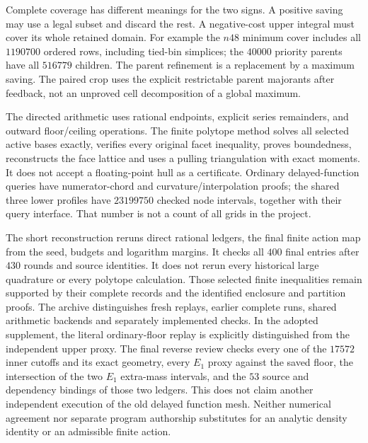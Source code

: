 Complete coverage has different meanings for the two signs.  A
positive saving may use a legal subset and discard the rest.  A
negative-cost upper integral must cover its whole retained domain.
For example the $n48$ minimum cover includes all $1190700$ ordered
rows, including tied-bin simplices; the $40000$ priority parents
have all $516779$ children.  The parent refinement is a replacement
by a maximum saving.  The paired crop uses the explicit restrictable
parent majorants after feedback, not an unproved cell decomposition
of a global maximum.

The directed arithmetic uses rational endpoints, explicit series
remainders, and outward floor/ceiling operations.  The finite
polytope method solves all selected active bases exactly, verifies
every original facet inequality, proves boundedness, reconstructs
the face lattice and uses a pulling triangulation with exact
moments.  It does not accept a floating-point hull as a certificate.
Ordinary delayed-function queries have numerator-chord and
curvature/interpolation proofs; the shared three lower profiles
have $23199750$ checked node intervals, together with their query
interface.  That number is not a count of all grids in the project.

The short reconstruction reruns direct rational ledgers, the final
finite action map from the seed, budgets and logarithm margins.
It checks all $400$ final entries after $430$ rounds and source
identities.  It does not rerun every historical large quadrature or
every polytope calculation.  Those selected finite inequalities
remain supported by their complete records and the identified
enclosure and partition proofs.  The archive distinguishes fresh
replays, earlier complete runs, shared arithmetic backends and
separately implemented checks.  In the adopted supplement, the literal
ordinary-floor replay is explicitly distinguished from the independent
upper proxy.  The final reverse review checks every one of the $17572$
inner cutoffs and its exact geometry, every $E_1$ proxy against the
saved floor, the intersection of the two $E_1$ extra-mass intervals,
and the $53$ source and dependency bindings of those two ledgers.
This does not claim another independent execution of the old delayed
function mesh.  Neither numerical agreement nor
separate program authorship substitutes for an analytic density
identity or an admissible finite action.

